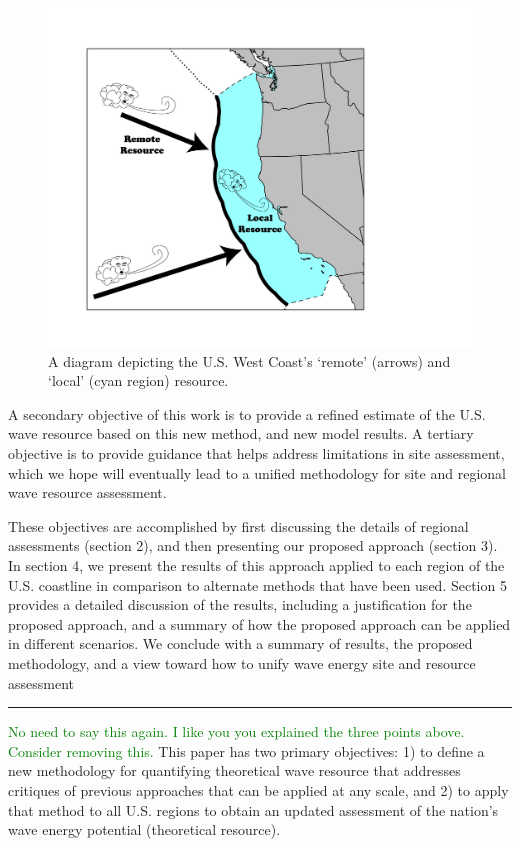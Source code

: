 \begin{figure}[ht]
  \centering
\includegraphics[width=0.9\linewidth]{../diagram/EEZ_contour03_edit01.png}
  \caption{A diagram depicting the U.S. West Coast’s ‘remote’ (arrows) and ‘local’ (cyan region) resource.}
  \label{fig:diagram:west-eez}
\end{figure}

A secondary objective of this work is to provide a refined estimate of
the U.S. wave resource based on this new method, and new model
results. A tertiary objective is to provide guidance that helps
address limitations in site assessment, which we hope will eventually
lead to a unified methodology for site and regional wave resource
assessment.

These objectives are accomplished by first discussing the details of regional assessments (section 2), and then presenting our proposed approach (section 3). In section 4, we present the results of this approach applied to each region of the U.S. coastline in comparison to alternate methods that have been used. Section 5 provides a detailed discussion of the results, including a justification for the proposed approach, and a summary of how the proposed approach can be applied in different scenarios. We conclude with a summary of results, the proposed methodology, and a view toward how to unify wave energy site and resource assessment

\noindent\rule{12cm}{0.4pt}

\textcolor{green}{No need to say this again. I like you you explained the three points above. Consider removing this.}
This paper has two primary objectives: 1) to define a new methodology for quantifying theoretical wave resource that addresses critiques of previous approaches that can be applied at any scale, and 2) to apply that method to all U.S. regions to obtain an updated assessment of the nation's wave energy potential (theoretical resource).

